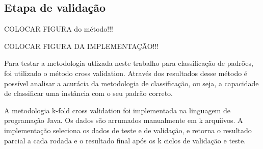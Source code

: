 \subsection{Etapa de validação}
COLOCAR FIGURA do método!!!

COLOCAR FIGURA DA IMPLEMENTAÇÃO!!!

Para testar a metodologia utlizada neste trabalho para classificação de padrões, foi utilizado o método cross validation. Através dos resultados desse método é possível analisar a acurácia da metodologia de classificação, ou seja, a capacidade de classificar uma instância com o seu padrão correto.

A metodologia k-fold cross validation foi implementada na linguagem de programação Java. Os dados são arrumados manualmente em k arquiivos. A implementação seleciona os dados de teste e de validação, e retorna o resultado parcial a cada rodada e o resultado final após os k ciclos de validação e teste.



